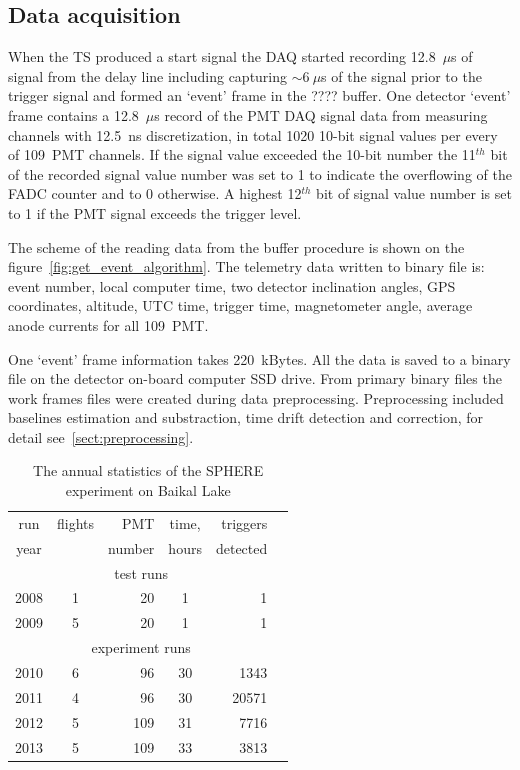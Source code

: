 \documentclass[final,5p,times,twocolumn]{elsarticle}
\begin{document}
\subsection{Data acquisition} 

When the TS produced a start signal the DAQ started recording 12.8~$\mu$s of signal from the delay line including capturing $\sim 6~\mu$s of the signal prior to the trigger signal and formed an `event' frame in the ???? buffer. One detector `event' frame contains a 12.8~$\mu$s record of the PMT DAQ signal data from measuring channels with 12.5~ns discretization, in total 1020 10-bit signal values per every of 109~PMT channels. If the signal value exceeded the 10-bit number the 11$^{th}$ bit of the recorded signal value number was set to 1 to indicate the overflowing of the FADC counter and to 0 otherwise. A highest 12$^{th}$ bit of signal value number is set to 1 if the PMT signal exceeds the trigger level. 

The scheme of the reading data from the buffer procedure is shown on the figure~\ref{fig:get_event_algorithm}. 
The telemetry data written to binary file is: event number, local computer time, two detector inclination angles, GPS coordinates, altitude, UTC time, trigger time, magnetometer angle, average anode currents for all 109~PMT. 



One `event' frame information takes 220~kBytes. All the data is saved to a binary file on the detector on-board computer SSD drive. From primary binary files the work frames files were created during data preprocessing. Preprocessing included baselines estimation and substraction, time drift detection and correction, for detail see~\ref{sect:preprocessing}.


\begin{table}[b]
\centering
\caption{The annual statistics of the SPHERE experiment on Baikal Lake}
\label{tab:statistics}
\vspace{1pc}
\begin{tabular}{|c||c|r|c|r|r|}
\hline
run  & flights & PMT    & time, & triggers \\ 
year &         & number & hours & detected \\ 
\hline \hline
\multicolumn{5}{|c|}{test runs} \\
\hline
2008 & 1 &  20 &  1 &     1 \\ 
2009 & 5 &  20 &  1 &     1 \\ 
\hline
\multicolumn{5}{|c|}{experiment runs} \\
\hline
2010 & 6 &  96 & 30 &  1343 \\
2011 & 4 &  96 & 30 & 20571 \\
2012 & 5 & 109 & 31 &  7716 \\
2013 & 5 & 109 & 33 &  3813 \\
\hline
\end{tabular}
\end{table}
\end{document}
